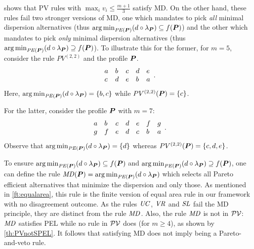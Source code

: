 \documentclass[pagesize, twoside=off, bibliography=totoc, DIV=calc, fontsize=12pt, a4paper]{scrartcl}
\begin{document}

\begin{remark}
	 shows that PV rules with $\max_i v_i ≤ \frac{m + 1}{3}$ satisfy MD. On the other hand, these rules fail two stronger versions of MD, one which mandates to pick \emph{all} minimal dispersion alternatives (thus $\argmin_{\PE} (d \circ \lprof) \subseteq f(\prof)$) and the other which mandates to pick \emph{only} minimal dispersion alternatives (thus $\argmin_{\PE} (d \circ \lprof) \supseteq f(\prof)$). To illustrate this for the former, for $m = 5$, consider the rule $PV^{(2, 2)}$ and the profile $\bm{P}$.
	\begin{equation}
		\begin{array}{*5{l}}
			a& b & c & d & e \\
			c& d & e & b & a\\
		\end{array}.
	\end{equation}
	Here, $\argmin_{\PE} (d \circ \lprof) = \set{b, c}$ while $PV^{(2, 2)}(\bm{P}) = \{c\}$.

For the latter, consider the profile $\bm{P}$ with $m=7$:
	\begin{equation}
		\begin{array}{*7{l}}
			a& b & c & d & e & f & g\\
			g& f & e & d & c& b & a \\
		\end{array}.
	\end{equation}
Observe that $\argmin_{\PE} (d \circ \lprof) = \set{d}$ whereas $PV^{(2, 2)}(\bm{P})=\{c,d,e\}$.
\end{remark}

\begin{remark}
	To ensure $\argmin_{\PE} (d \circ \lprof) \subseteq f(\prof)$ and $\argmin_{\PE} (d \circ \lprof) \supseteq f(\prof)$, one can define the rule $\MD(\prof) = \argmin_{\PE}(d \circ \lprof)$ which selects all Pareto efficient alternatives that minimize the dispersion and only those. As mentioned in \cref{ft:equalarea}, this rule is the finite version of  equal area rule in our framework with no disagreement outcome.
 As the rules $\mathit{UC}$, $\mathit{VR}$ and $\mathit{SL}$ fail the MD principle, they are distinct from the rule $\mathit{MD}$. Also, the rule $\mathit{MD}$ is not in $\mathcal{PV}$: $\mathit{MD}$ satisfies PEL while no rule in $\mathcal{PV}$ does (for $m ≥ 4$), as shown by \cref{th:PVnotSPEL}. It follows that satisfying MD does not imply being a Pareto-and-veto rule.
\end{remark}
\end{document}
